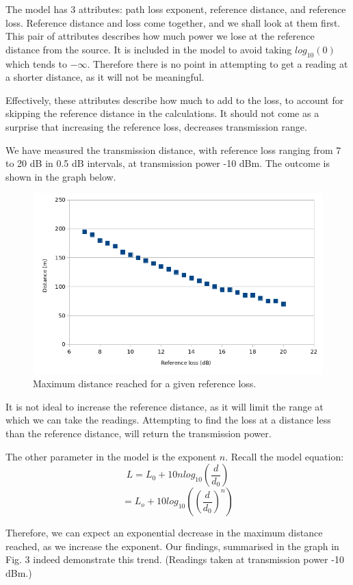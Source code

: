\documentclass[11pt,journal]{article}
\begin{document}
	The model has 3 attributes: path loss exponent, reference distance, and reference loss. Reference distance and loss come together, and we shall look at them first. This pair of attributes describes how much power we lose at the reference distance from the source. It is included in the model to avoid taking $log_{10}(0)$ which tends to $-\infty$. Therefore there is no point in attempting to get a reading at a shorter distance, as it will not be meaningful. 
	
	Effectively, these attributes describe how much to add to the loss, to account for skipping the reference distance in the calculations. It should not come as a surprise that increasing the reference loss, decreases transmission range. 
	
	We have measured the transmission distance, with reference loss ranging from 7 to 20 dB in 0.5 dB intervals, at transmission power -10 dBm. The outcome is shown in the graph below.
	
	\begin{figure}[h]
		\centering
		\includegraphics[scale=0.6]{graph_log_refloss.png}
		\caption{Maximum distance reached for a given reference loss.}
	\end{figure}
	
	It is not ideal to increase the reference distance, as it will limit the range at which we can take the readings. Attempting to find the loss at a distance less than the reference distance, will return the transmission power.

	The other parameter in the model is the exponent $n$. Recall the model equation:
		\[L = L_0 + 10nlog_{10}(\dfrac{d}{d_0})\] 
		\[ = L_o + 10log_{10}((\dfrac{d}{d_0})^n)\]
		
	Therefore, we can expect an exponential decrease in the maximum distance reached, as we increase the exponent. Our findings, summarised in the graph in Fig. 3 indeed demonstrate this trend. (Readings taken at transmission power -10 dBm.)
	
\end{document}
